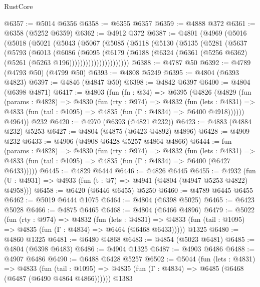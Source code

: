 \begin{lexlean}{RustCore}
\begin{coremodule}
@6357 := @5014 @6356
@6358 := @6355 @6357
@6359 := @4888 @372
@6361 := @6358 (@5252 @6359)
@6362 := @4912 @372
@6387 := @4801
    (@4969
      (@5016
        (@5018
          (@5021
            (@5043
              (@5067
                (@5085
                  (@5118
                    (@5130
                      (@5135
                        (@5281
                          (@5637
                            (@5793
                              (@6013
                                (@6086
                                  (@6095
                                    (@6179
                                      (@6188
                                        (@6324
                                          (@6361
                                            (@5256 @6362)
                                            (@5261 (@5263 @196))))))))))))))))))))))
@6388 := @4787 @50
@6392 := @4789 (@4793 @50) (@4799 @50)
@6393 := @4808 @5249
@6395 := @4804 (@6393 @4823)
@6397 := @4846 (@4847 @50)
@6398 := @4842 @6397
@6400 := @4804 (@6398 @4871)
@6417 := @4803
    (fun (fn : @34) =>
    @6395
      (@4826
        (@4829
          (fun (params : @4828) =>
          @4830
            (fun (rty : @974) =>
            @4832
              (fun (lets : @4831) =>
              @4833 (fun (tail : @1095) => @4835 (fun (Γ : @4834) => @6400 @4918))))))
        @4964))
    @232
@6420 := @4970 (@6393 (@4821 @232))
@6423 := @4883 (@4884 @232) @5253
@6427 := @4804 (@4875 (@6423 @4892) @4896)
@6428 := @4909 @232
@6433 := @4906 (@4908 @6428 @5257 @4864 @4866)
@6444 := fun (params : @4828) =>
  @4830
    (fun (rty : @974) =>
    @4832
      (fun (lets : @4831) =>
      @4833 (fun (tail : @1095) => @4835 (fun (Γ : @4834) => @6400 (@6427 @6433)))))
@6445 := @4829 @6444
@6446 := @4826 @6445
@6455 := @4932 (fun (U : @4931) => @4933 (fun (t : @7) => @4941 (@4804 (@4947 @5253 @4822) @4958)))
@6458 := @6420 (@6446 @6455) @5250
@6460 := @4789 @6445 @6455
@6462 := @5019 @6444 @1075
@6464 := @4804 (@6398 @5025)
@6465 := @6423 @5028
@6466 := @4875 @6465
@6468 := @4804 (@6466 @4896)
@6479 := @5022
    (fun (rty : @974) =>
    @4832
      (fun (lets : @4831) =>
      @4833 (fun (tail : @1095) => @4835 (fun (Γ : @4834) => @6464 (@6468 @6433)))))
    @1325
@6480 := @4860 @1325
@6481 := @6480 @4868
@6483 := @4854 (@5023 @6481)
@6485 := @4804 (@6398 @6483)
@6486 := @4904 @1325
@6487 := @4903 @6486
@6488 := @4907 @6486
@6490 := @6488 @6428 @5257
@6502 := @5044
    (fun (lets : @4831) =>
    @4833
      (fun (tail : @1095) => @4835 (fun (Γ : @4834) => @6485 (@6468 (@6487 (@6490 @4864 @4866))))))
    @1383

\end{coremodule}
\end{lexlean}
